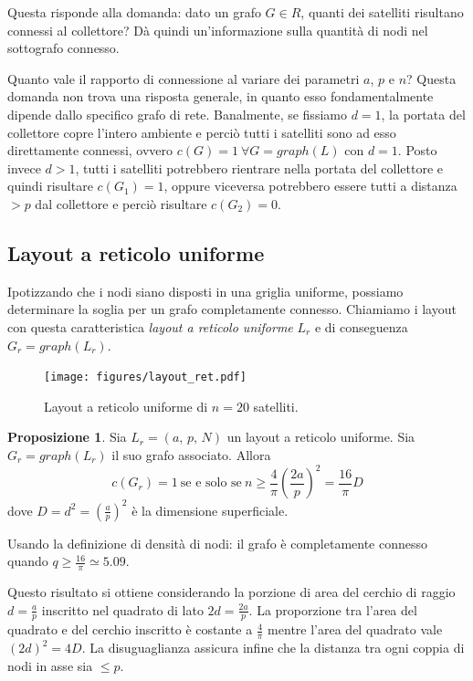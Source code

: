 \documentclass[a4paper,11pt]{article}
\theoremstyle{definition}
\newtheorem{proposition}{Proposizione}
\begin{document}
Questa risponde alla domanda: dato un grafo $G \in R$, quanti dei satelliti risultano connessi al collettore? Dà quindi un'informazione sulla quantità di nodi nel sottografo connesso.

Quanto vale il rapporto di connessione al variare dei parametri $a$, $p$ e $n$? Questa domanda non trova una risposta generale, in quanto esso fondamentalmente dipende dallo specifico grafo di rete. Banalmente, se fissiamo $d = 1$, la portata del collettore copre l'intero ambiente e perciò tutti i satelliti sono ad esso direttamente connessi, ovvero $c(G) = 1 \ \forall G = graph(L)$ con $d = 1$. Posto invece $d > 1$, tutti i satelliti potrebbero rientrare nella portata del collettore e quindi risultare $c(G_1) = 1$, oppure viceversa potrebbero essere tutti a distanza $> p$ dal collettore e perciò risultare $c(G_2) = 0$.

\subsection{Layout a reticolo uniforme}

Ipotizzando che i nodi siano disposti in una griglia uniforme, possiamo determinare la soglia per un grafo completamente connesso. Chiamiamo i layout con questa caratteristica \emph{layout a reticolo uniforme} $L_r$ e di conseguenza $G_r = graph(L_r)$.

\begin{figure}[H]
\centering
\texttt{[image: figures/layout\_ret.pdf]}
\caption{Layout a reticolo uniforme di $n=20$ satelliti.}
\end{figure}

\begin{proposition}
Sia $L_r = (a,\,p,\,N)$ un layout a reticolo uniforme. Sia $G_r = graph(L_r)$ il suo grafo associato. Allora
\begin{equation*}
c(G_r) = 1 \ \text{se e solo se} \ n \geq \frac{4}{\pi} \left(\frac{2a}{p}\right)^2 = \frac{16}{\pi} D
\end{equation*}
dove $D = d^2 = \left(\frac{a}{p}\right)^2$ è la dimensione superficiale.
\end{proposition}

Usando la definizione di densità di nodi: il grafo è completamente connesso quando $q \geq \frac{16}{\pi} \simeq 5.09$.

Questo risultato si ottiene considerando la porzione di area del cerchio di raggio $d = \frac{a}{p}$ inscritto nel quadrato di lato $2d = \frac{2a}{p}$. La proporzione tra l'area del quadrato e del cerchio inscritto è costante a $\frac{4}{\pi}$ mentre l'area del quadrato vale $(2d)^2 = 4D$. La disuguaglianza assicura infine che la distanza tra ogni coppia di nodi in asse sia $\leq p$.
\end{document}
